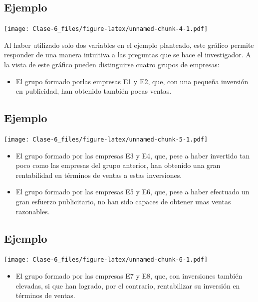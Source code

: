 \documentclass[]{article}
\providecommand{\tightlist}{%
  \setlength{\itemsep}{0pt}\setlength{\parskip}{0pt}}
\begin{document}
\subsection{Ejemplo}\label{ejemplo-3}

\hypertarget{left}{}
\texttt{[image: Clase-6\_files/figure-latex/unnamed-chunk-4-1.pdf]}

\hypertarget{right}{}
Al haber utilizado solo dos variables en el ejemplo planteado, este
gráfico permite responder de una manera intuitiva a las preguntas que se
hace el investigador. A la vista de este gráfico pueden distinguirse
cuatro grupos de empresas:

\begin{itemize}
\tightlist
\item
  El grupo formado porlas empresas E1 y E2, que, con una pequeña
  inversión en publicidad, han obtenido también pocas ventas.
\end{itemize}

\subsection{Ejemplo}\label{ejemplo-4}

\hypertarget{left}{}
\texttt{[image: Clase-6\_files/figure-latex/unnamed-chunk-5-1.pdf]}

\hypertarget{right}{}
\begin{itemize}
\item
  El grupo formado por las empresas E3 y E4, que, pese a haber invertido
  tan poco como las empresas del grupo anterior, han obtenido una gran
  rentabilidad en términos de ventas a estas inversiones.
\item
  El grupo formado por las empresas E5 y E6, que, pese a haber efectuado
  un gran esfuerzo publicitario, no han sido capaces de obtener unas
  ventas razonables.
\end{itemize}

\subsection{Ejemplo}\label{ejemplo-5}

\hypertarget{left}{}
\texttt{[image: Clase-6\_files/figure-latex/unnamed-chunk-6-1.pdf]}

\hypertarget{right}{}
\begin{itemize}
\tightlist
\item
  El grupo formado por las empresas E7 y E8, que, con inversiones
  también elevadas, si que han logrado, por el contrario, rentabilizar
  su inversión en términos de ventas.
\end{itemize}
\end{document}
